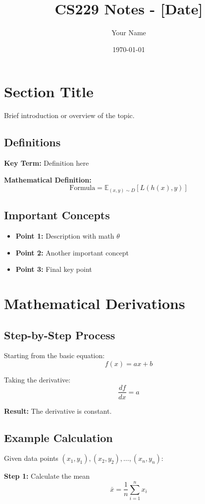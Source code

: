 \documentclass{article}
\title{CS229 Notes - [Date]}
\author{Your Name}
\date{\today}
\begin{document}
\maketitle

\section{Section Title}

Brief introduction or overview of the topic.

\subsection{Definitions}
\textbf{Key Term:} Definition here

\textbf{Mathematical Definition:}
\[
\text{Formula} = \mathbb{E}_{(x,y) \sim D}[L(h(x), y)]
\]

\subsection{Important Concepts}
\begin{itemize}
    \item \textbf{Point 1:} Description with math $\theta$
    \item \textbf{Point 2:} Another important concept
    \item \textbf{Point 3:} Final key point
\end{itemize}

\section{Mathematical Derivations}

\subsection{Step-by-Step Process}
Starting from the basic equation:
\[
f(x) = ax + b
\]

Taking the derivative:
\[
\frac{df}{dx} = a
\]

\textbf{Result:} The derivative is constant.

\subsection{Example Calculation}
Given data points $(x_1, y_1), (x_2, y_2), \ldots, (x_n, y_n)$:

\textbf{Step 1:} Calculate the mean
\[
\bar{x} = \frac{1}{n}\sum_{i=1}^{n} x_i
\]
\end{document}
